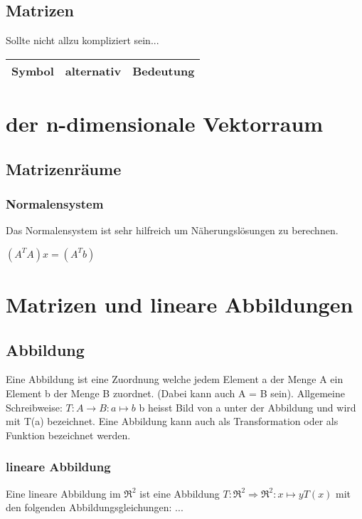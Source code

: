 \documentclass[11pt,a4paper,onecolumn]{scrartcl}
\begin{document}
\begin{flushleft}
\subsection{Matrizen}
Sollte nicht allzu kompliziert sein... \linebreak
\begin{tabular}{|c|c|c|}
\hline
Symbol & alternativ & Bedeutung \\
\hline


\end{tabular}
\section{der n-dimensionale Vektorraum}
\subsection{Matrizenräume}
\subsubsection{Normalensystem}
Das Normalensystem ist sehr hilfreich um Näherungslösungen zu berechnen.\linebreak
\linebreak

$(A^{T}A)x=(A^{T}b)$

\section{Matrizen und lineare Abbildungen}
\subsection{Abbildung}
Eine Abbildung ist eine Zuordnung welche jedem Element a der Menge A ein Element b der Menge B zuordnet. (Dabei kann auch A = B sein).\linebreak
Allgemeine Schreibweise:
$T : A \longrightarrow B : a \mapsto b$
b heisst Bild von a unter der Abbildung und wird mit T(a) bezeichnet.\linebreak
Eine Abbildung kann auch als Transformation oder als Funktion bezeichnet werden.

\subsubsection{lineare Abbildung}
Eine lineare Abbildung im $\Re^{2}$ ist eine Abbildung
$T:\Re^{2} \Rightarrow \Re^{2} : x \mapsto y T(x)$
mit den folgenden Abbildungsgleichungen:
...\linebreak


\end{flushleft}
\end{document}
